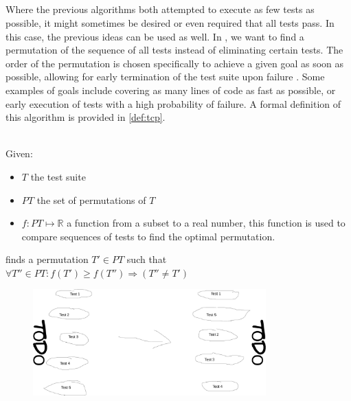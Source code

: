 
\subsection{\tcp{}}
Where the previous algorithms both attempted to execute as few tests as possible, it might sometimes be desired or even required that all tests pass. In this case, the previous ideas can be used as well. In \tcp{}, we want to find a permutation of the sequence of all tests instead of eliminating certain tests. The order of the permutation is chosen specifically to achieve a given goal as soon as possible, allowing for early termination of the test suite upon failure \cite{10.1002/stv.430}. Some examples of goals include covering as many lines of code as fast as possible, or early execution of tests with a high probability of failure. A formal definition of this algorithm is provided in \autoref{def:tcp}.

\begin{definition}[\tcp{}]
\label{def:tcp}
\mbox{}\\Given:
\begin{itemize}
	\item $T$ the test suite
	\item $PT$ the set of permutations of $T$
	\item $f: PT \mapsto \mathbb{R}$ a function from a subset to a real number, this function is used to compare sequences of tests to find the optimal permutation.
\end{itemize}

\noindent \tcp{} finds a permutation $T' \in PT$ such that $\forall T'' \in PT : f(T') \ge f(T'') \Rightarrow (T'' \ne T')$ 
\end{definition}

\begin{figure}[htbp!]
	\centering
	\includegraphics[width=0.8\textwidth]{assets/approach-tcp.pdf}
	\caption{\tcp{}}
	\label{fig:tcp}
\end{figure}